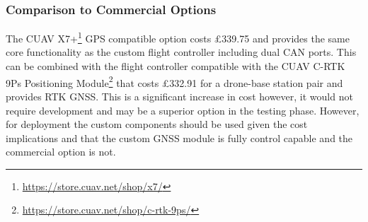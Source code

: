 \subsubsection{Comparison to Commercial Options}\label{sub_sub_section:tgt_commercial_options}

The CUAV X7+\footnote{\url{https://store.cuav.net/shop/x7/}} GPS compatible option costs £339.75 and provides the same core functionality as the custom flight controller including dual \gls{CAN} ports. This can be combined with the flight controller compatible with the CUAV C-RTK 9Ps Positioning Module\footnote{\url{https://store.cuav.net/shop/c-rtk-9ps/}} that costs £332.91 for a drone-base station pair and provides \gls{RTK} \gls{GNSS}. This is a significant increase in cost however, it would not require development and may be a superior option in the testing phase. However, for deployment the custom components should be used given the cost implications and that the custom \gls{GNSS} module is fully control capable and the commercial option is not. 
